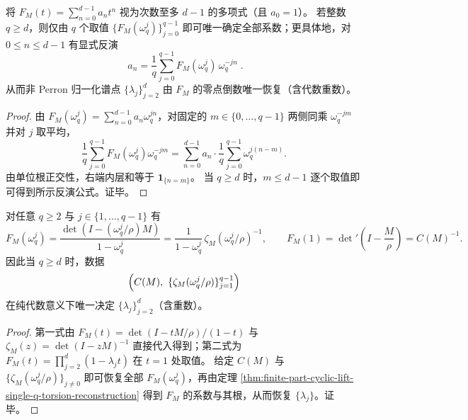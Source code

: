 \begin{theorem}\label{thm:finite-part-cyclic-lift-single-q-torsion-reconstruction}
将
\(
F_M(t)=\sum_{n=0}^{d-1}a_n t^n
\)
视为次数至多 \(d-1\) 的多项式（且 \(a_0=1\)）。
若整数 \(q\ge d\)，则仅由 \(q\) 个取值 \(\{F_M(\omega_q^j)\}_{j=0}^{q-1}\) 即可唯一确定全部系数；更具体地，对 \(0\le n\le d-1\) 有显式反演
\[
\boxed{\;
a_n=\frac{1}{q}\sum_{j=0}^{q-1}F_M(\omega_q^j)\,\omega_q^{-jn}\; }.
\]
从而非 Perron 归一化谱点 \(\{\lambda_j\}_{j=2}^{d}\) 由 \(F_M\) 的零点倒数唯一恢复（含代数重数）。
\end{theorem}
\begin{proof}
由 \(F_M(\omega_q^j)=\sum_{n=0}^{d-1}a_n\omega_q^{jn}\)，对固定的 \(m\in\{0,\dots,q-1\}\) 两侧同乘 \(\omega_q^{-jm}\) 并对 \(j\) 取平均，
\[
\frac{1}{q}\sum_{j=0}^{q-1}F_M(\omega_q^j)\omega_q^{-jm}
=\sum_{n=0}^{d-1}a_n\cdot \frac{1}{q}\sum_{j=0}^{q-1}\omega_q^{j(n-m)}.
\]
由单位根正交性，右端内层和等于 \(\mathbf{1}_{\{n=m\}}\)。
当 \(q\ge d\) 时，\(m\le d-1\) 逐个取值即可得到所示反演公式。证毕。
\end{proof}

\begin{corollary}\label{cor:finite-part-cyclic-lift-zeta-torsion-determines-spectrum}
对任意 \(q\ge 2\) 与 \(j\in\{1,\dots,q-1\}\) 有
\[
F_M(\omega_q^j)=\frac{\det(I-(\omega_q^j/\rho)M)}{1-\omega_q^j}
=\frac{1}{1-\omega_q^j}\,\zeta_M(\omega_q^j/\rho)^{-1},
\qquad
F_M(1)=\det\nolimits'\!\left(I-\frac{M}{\rho}\right)=C(M)^{-1}.
\]
因此当 \(q\ge d\) 时，数据
\[
\Bigl(C(M),\ \{\zeta_M(\omega_q^j/\rho)\}_{j=1}^{q-1}\Bigr)
\]
在纯代数意义下唯一决定 \(\{\lambda_j\}_{j=2}^{d}\)（含重数）。
\end{corollary}
\begin{proof}
第一式由 \(F_M(t)=\det(I-tM/\rho)/(1-t)\) 与 \(\zeta_M(z)=\det(I-zM)^{-1}\) 直接代入得到；第二式为 \(F_M(t)=\prod_{j=2}^{d}(1-\lambda_j t)\) 在 \(t=1\) 处取值。
给定 \(C(M)\) 与 \(\{\zeta_M(\omega_q^j/\rho)\}_{j\ne 0}\) 即可恢复全部 \(F_M(\omega_q^j)\)，再由定理 \ref{thm:finite-part-cyclic-lift-single-q-torsion-reconstruction} 得到 \(F_M\) 的系数与其根，从而恢复 \(\{\lambda_j\}\)。证毕。
\end{proof}

